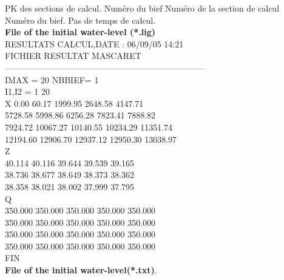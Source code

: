 \documentclass[a4paper,12pt]{article}
\begin{document}
PK des sections de calcul.  Num\'ero du bief Num\'ero de la section de calcul 
Num\'ero du bief.  Pas de temps de calcul.\\
\vspace{0.5cm}
\textbf{File of the initial water-level (*.lig)}\\
\vspace{0.5cm}
RESULTATS CALCUL,DATE :  06/09/05 14:21\\
FICHIER RESULTAT MASCARET         \\                                      
----------------------------------------------------------------------- \\
 IMAX  =   20 NBBIEF=    1\\
 I1,I2 =    1   20\\
 X
         0.00        60.17      1999.95      2648.58      4147.71\\
      5728.58      5998.86      6256.28      7823.41      7888.82\\
      7924.72     10067.27     10140.55     10234.29     11351.74\\
     12194.60     12906.70     12937.12     12950.30     13038.97\\
 Z\\
       40.114       40.116       39.644       39.539       39.165\\
       38.736       38.677       38.649       38.373       38.362\\
       38.358       38.021       38.002       37.999       37.795\\
 Q\\
      350.000      350.000      350.000      350.000      350.000\\
      350.000      350.000      350.000      350.000      350.000\\
      350.000      350.000      350.000      350.000      350.000\\
      350.000      350.000      350.000      350.000      350.000\\
 FIN\\



\vspace{0.5cm}
\textbf{File of the initial water-level(*.txt)}.
\vspace{0.5cm}
\end{document}

